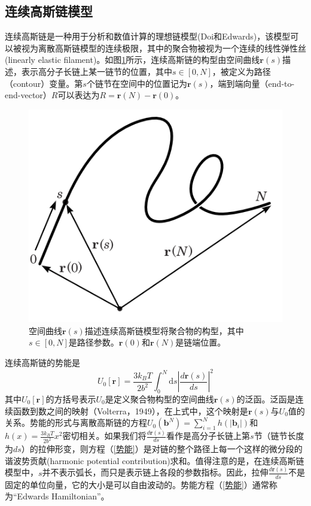\subsection{连续高斯链模型}
连续高斯链是一种用于分析和数值计算的理想链模型(Doi和Edwards)，该模型可以被视为离散高斯链模型的连续极限，其中的聚合物被视为一个连续的线性弹性丝(linearly elastic filament)。如图\ref{空间曲线描述聚合物构型}所示，连续高斯链的构型由空间曲线$\mathbf{r}(s)$描述，表示高分子长链上某一链节的位置，其中$s\in [0,N]$，被定义为路径（contour）变量。第$s$个链节在空间中的位置记为$\mathbf{r}(s)$，端到端向量（end-to-end-vector）$R$可以表达为$R=\mathbf{r}(N)−\mathbf{r}(0)$。
\begin{figure}[H]
\centering
\includegraphics[scale=0.5]{./figures/41.png}
\caption{空间曲线$\mathbf{r}(s)$描述连续高斯链模型将聚合物的构型，其中$s\in [0,N]$是路径参数。$\mathbf{r}(0)$和$\mathbf{r}(N)$是链端位置。}
\label{空间曲线描述聚合物构型}
\end{figure}
连续高斯链的势能是
\begin{equation}
U_0[\mathbf{r}]=\frac{3k_BT}{2b^2}\int_{0}^{N} \mathrm{d}s\left| \frac{d\mathbf{r}(s)}{ds} \right|^2 \label{势能}
\end{equation}
其中$U_0[\mathbf{r}]$的方括号表示$U_0$是定义聚合物构型的空间曲线$\mathbf{r}(s)$的泛函。泛函是连续函数到数之间的映射（Volterra，1949），在上式中，这个映射是$\mathbf{r}(s)$与$U_0$值的关系。势能的形式与离散高斯链的方程$U_0(\mathbf b^N)=\sum_{i=1}^{N}h(\left|\mathbf{b}_i\right|)$和$h(x)=\frac{3k_BT}{2b^2}x^2$密切相关。如果我们将$\frac{d\mathbf{r}(s)}{ds}$看作是高分子长链上第$s$节（链节长度为$ds$）的拉伸形变，则方程（\ref{势能}）是对链的整个路径上每一个这样的微分段的谐波势贡献(harmonic potential contribution)求和。值得注意的是，在连续高斯链模型中，$s$并不表示弧长，而只是表示链上各段的参数指标。因此，拉伸$\frac{d\mathbf{r}(s)}{ds}$不是固定的单位向量，它的大小是可以自由波动的。势能方程（\ref{势能}）通常称为“Edwards Hamiltonian”。

